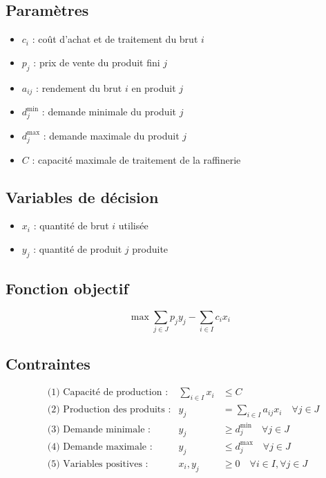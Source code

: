 \documentclass[a4paper,11pt]{article}
\begin{document}
\subsection{Paramètres}
\begin{itemize}
  \item $c_i$ : coût d'achat et de traitement du brut $i$
  \item $p_j$ : prix de vente du produit fini $j$
  \item $a_{ij}$ : rendement du brut $i$ en produit $j$
  \item $d_j^{\min}$ : demande minimale du produit $j$
  \item $d_j^{\max}$ : demande maximale du produit $j$
  \item $C$ : capacité maximale de traitement de la raffinerie
\end{itemize}

\subsection{Variables de décision}
\begin{itemize}
  \item $x_i$ : quantité de brut $i$ utilisée
  \item $y_j$ : quantité de produit $j$ produite
\end{itemize}

\subsection{Fonction objectif}
\[
\max \sum_{j \in J} p_j y_j - \sum_{i \in I} c_i x_i
\]

\subsection{Contraintes}
\begin{align*}
&\text{(1) Capacité de production :} & \sum_{i \in I} x_i &\leq C \\
&\text{(2) Production des produits :} & y_j &= \sum_{i \in I} a_{ij} x_i \quad \forall j \in J \\
&\text{(3) Demande minimale :} & y_j &\geq d_j^{\min} \quad \forall j \in J \\
&\text{(4) Demande maximale :} & y_j &\leq d_j^{\max} \quad \forall j \in J \\
&\text{(5) Variables positives :} & x_i, y_j &\geq 0 \quad \forall i \in I, \forall j \in J
\end{align*}
\end{document}

